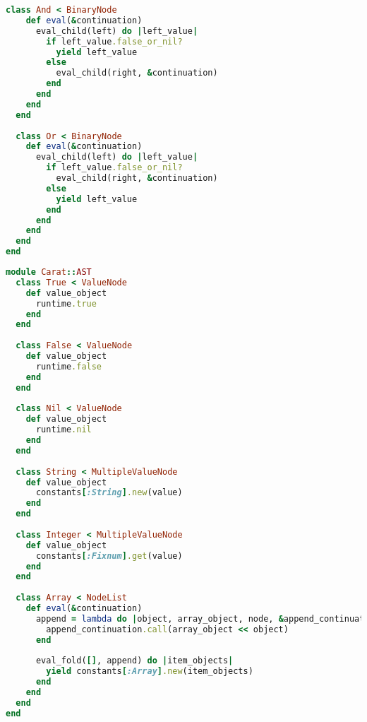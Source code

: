 \begin{lstlisting}[title={\small\ttfamily\bfseries ast/control.rb},language=Ruby]
  class And < BinaryNode
    def eval(&continuation)
      eval_child(left) do |left_value|
        if left_value.false_or_nil?
          yield left_value
        else
          eval_child(right, &continuation)
        end
      end
    end
  end
  
  class Or < BinaryNode
    def eval(&continuation)
      eval_child(left) do |left_value|
        if left_value.false_or_nil?
          eval_child(right, &continuation)
        else
          yield left_value
        end
      end
    end
  end
end

\end{lstlisting}
\begin{lstlisting}[title={\small\ttfamily\bfseries ast/literals.rb},language=Ruby]
module Carat::AST
  class True < ValueNode
    def value_object
      runtime.true
    end
  end
  
  class False < ValueNode
    def value_object
      runtime.false
    end
  end
  
  class Nil < ValueNode
    def value_object
      runtime.nil
    end
  end
  
  class String < MultipleValueNode
    def value_object
      constants[:String].new(value)
    end
  end
  
  class Integer < MultipleValueNode
    def value_object
      constants[:Fixnum].get(value)
    end
  end
  
  class Array < NodeList
    def eval(&continuation)
      append = lambda do |object, array_object, node, &append_continuation|
        append_continuation.call(array_object << object)
      end
      
      eval_fold([], append) do |item_objects|
        yield constants[:Array].new(item_objects)
      end
    end
  end
end

\end{lstlisting}

